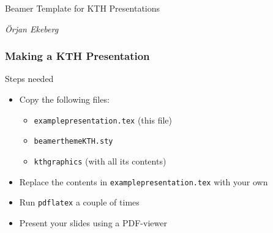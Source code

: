 \documentclass[aspectratio=1610]{beamer}
\begin{document}
\begin{frame}

  \vspace{0.02\textheight}
  
  \begin{Large}
    Beamer Template for KTH Presentations
  \end{Large}

  \vspace{0.1\textheight}

  \begin{small}
    \textit{Örjan Ekeberg}
  \end{small}
\end{frame}




\begin{frame}
  \frametitle{Making a KTH Presentation}

  \begin{block}{Steps needed}
    \begin{itemize}
    \item Copy the following files:
    \begin{itemize}
    \item \texttt{examplepresentation.tex} (this file)
    \item \texttt{beamerthemeKTH.sty}
    \item \texttt{kthgraphics} (with all its contents)
    \end{itemize}
    \item Replace the contents in \texttt{examplepresentation.tex} with your own
    \item Run \texttt{pdflatex} a couple of times
    \item Present your slides using a PDF-viewer
    \end{itemize}
  \end{block}

\end{frame}
\end{document}
